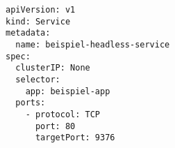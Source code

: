 \begin{verbatim}
apiVersion: v1
kind: Service
metadata:
  name: beispiel-headless-service
spec:
  clusterIP: None
  selector:
    app: beispiel-app
  ports:
    - protocol: TCP
      port: 80
      targetPort: 9376
\end{verbatim}